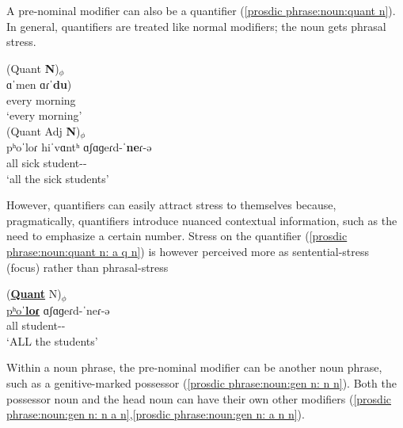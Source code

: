 A pre-nominal modifier can also be a quantifier (\ref{prosdic phrase:noun:quant n}). In general, quantifiers are treated like normal modifiers; the noun gets phrasal stress. 

\begin{exe}
	\ex \label{prosdic phrase:noun:quant n}
	\begin{xlist}
		\ex \glll (Quant \textbf{N})$_\phi$ \\
		ɑˈmen ɑɾˈ\textbf{du}) \\
		every morning \\ 
		\trans `every morning' \label{prosdic phrase:noun:quant n: q n}
		\\ 
		\ex \glll (Quant Adj \textbf{N})$_\phi$ \\
		pʰoˈloɾ hiˈvɑntʰ ɑʃɑɡeɾd-ˈ\textbf{ne}ɾ-ə \\
		all sick student-{\pl}-{} \\ 
		\trans `all the sick students' \label{prosdic phrase:noun:quant n: q a n}
		\\ 
	\end{xlist}
\end{exe}

However, quantifiers can easily attract stress to themselves because, pragmatically, quantifiers introduce nuanced contextual information, such as the need to emphasize a certain number. Stress on the quantifier (\ref{prosdic phrase:noun:quant n:  a q n}) is however perceived more as sentential-stress (focus) rather than phrasal-stress

\begin{exe}
	\ex \glll (\underline{\textbf{Quant}}   {N})$_\phi$ \\
	\underline{pʰoˈ\textbf{loɾ}}  ɑʃɑɡeɾd-ˈ{ne}ɾ-ə   \\
	all  student-{\pl}-{} \\ 
	\trans `ALL the  students' \label{prosdic phrase:noun:quant n:  a q n}
	\\ 
\end{exe}

Within a noun phrase, the pre-nominal modifier can be another noun phrase, such as a   genitive-marked possessor (\ref{prosdic phrase:noun:gen n: n n}). Both the possessor noun and the head noun can have their own other modifiers (\ref{prosdic phrase:noun:gen n: n a n},\ref{prosdic phrase:noun:gen n: a n n}). 



